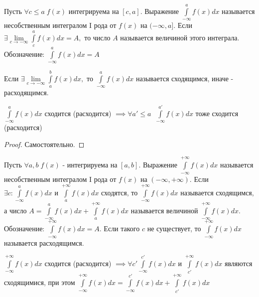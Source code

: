 \documentclass[../main.tex]{subfiles}
\begin{document}
\begin{definition}
    Пусть $\forall c\leqslant a\; f(x)$ интегрируема на $[c,a]$. Выражение $\int\limits_{-\infty  }^{a} f(x)dx$ называется несобственным интегралом I рода от $f(x)$ на $(-\infty,a]$. Если $\exists \lim\limits_{c\to -\infty}\int\limits_{c}^{a}f(x)dx=A,$ то число $A$ называется величиной этого интеграла. Обозначение: $\int\limits_{-\infty}^{a}f(x)dx=A$
\end{definition}
\begin{definition}
    Если $\exists \lim\limits_{c\to -\infty}\int\limits_{a}^{b}f(x)dx,$ то $\int\limits_{-\infty}^{a}f(x)dx$ называется сходящимся, иначе - расходящимся.
\end{definition}
\begin{theorem}
    $\int\limits_{-\infty   }^{a}f(x)dx  $ сходится (расходится) $\implies \forall a'\leqslant a \;\; \int\limits_{-\infty}^{a'} f(x)dx  $ тоже сходится (расходится)
\end{theorem}
\begin{proof}
    Самостоятельно.
\end{proof}

\begin{definition}
        Пусть $ \forall a,b\; f(x)$ - интегрируема на $[a,b]$. Выражение $\int\limits_{-\infty}^{+\infty}f(x)dx $ называется несобственным интегралом I рода от $f(x)$ на $(-\infty,+\infty)$. Если $\exists c: \int\limits_{-\infty   }^{a}f(x)dx $ и $\int\limits_{a    }^{+\infty}f(x)dx $ сходятся, то $\int\limits_{-\infty}^{+\infty}f(x)dx $ называется сходящимся, а число $A=\int\limits_{-\infty}^{a}f(x)dx + \int\limits_{a }^{+\infty}f(x)dx $ называется величиной $\int\limits_{-\infty}^{+\infty}f(x)dx.$ Обозначение: $\int\limits_{-\infty }^{+\infty  } f(x)dx = A$. Если такого $c$ не существует, то $\int\limits_{-\infty}^{+\infty}f(x)dx  $ называется расходящимся.
\end{definition}
\begin{theorem}
    $\int\limits_{-\infty}^{+\infty}f(x)dx $ сходится (расходится) $\implies \forall c' \int\limits_{-\infty}^{c'}f(x)dx $ и $\int\limits_{c'}^{+\infty}f(x)dx $ являются сходящимися, при этом $\int\limits_{-\infty    }^{+\infty  } f(x)dx=\int\limits_{-\infty   }^{c'}  f(x)dx+\int\limits_{c'}^{+\infty}f(x)dx $
\end{theorem}
\end{document}
